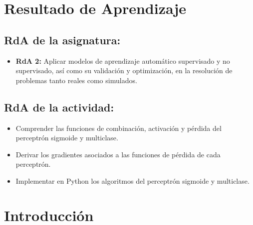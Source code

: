 \documentclass[a4,11pt]{aleph-notas}
\begin{document}
\encabezado


\section*{Resultado de Aprendizaje}

\subsection*{RdA de la asignatura:}
\begin{itemize}[leftmargin=*]
    \item \textbf{RdA 2:} 
    Aplicar modelos de aprendizaje automático supervisado y no supervisado, así como su validación y optimización, en la resolución de problemas tanto reales como simulados.
\end{itemize}

\subsection*{RdA de la actividad:}
\begin{itemize}[leftmargin=*]
    \item Comprender las funciones de combinación, activación y pérdida del perceptrón sigmoide y multiclase.
    \item Derivar los gradientes asociados a las funciones de pérdida de cada perceptrón.
    \item Implementar en Python los algoritmos del perceptrón sigmoide y multiclase.
\end{itemize}

\section*{Introducción}
\end{document}
